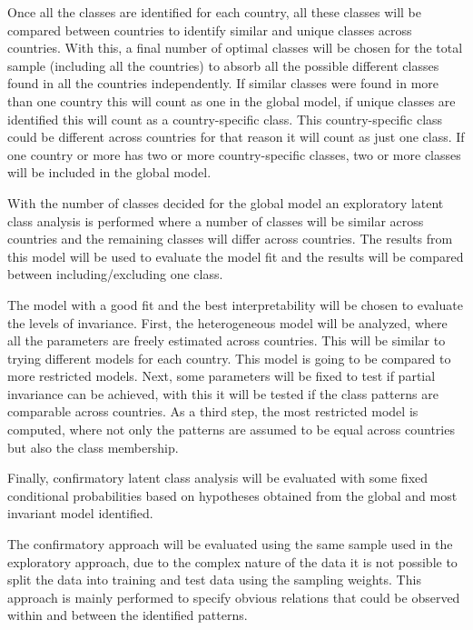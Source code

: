 \documentclass[12pt,a4paper,oneside]{reedthesis}
\begin{document}
Once all the classes are identified for each country, all these classes will be compared between countries to identify similar and unique classes across countries. With this, a final number of optimal classes will be chosen for the total sample (including all the countries) to absorb all the possible different classes found in all the countries independently. If similar classes were found in more than one country this will count as one in the global model, if unique classes are identified this will count as a country-specific class. This country-specific class could be different across countries for that reason it will count as just one class. If one country or more has two or more country-specific classes, two or more classes will be included in the global model.

With the number of classes decided for the global model an exploratory latent class analysis is performed where a number of classes will be similar across countries and the remaining classes will differ across countries. The results from this model will be used to evaluate the model fit and the results will be compared between including/excluding one class.

The model with a good fit and the best interpretability will be chosen to evaluate the levels of invariance. First, the heterogeneous model will be analyzed, where all the parameters are freely estimated across countries. This will be similar to trying different models for each country. This model is going to be compared to more restricted models. Next, some parameters will be fixed to test if partial invariance can be achieved, with this it will be tested if the class patterns are comparable across countries. As a third step, the most restricted model is computed, where not only the patterns are assumed to be equal across countries but also the class membership.

Finally, confirmatory latent class analysis will be evaluated with some fixed conditional probabilities based on hypotheses obtained from the global and most invariant model identified.

The confirmatory approach will be evaluated using the same sample used in the exploratory approach, due to the complex nature of the data it is not possible to split the data into training and test data using the sampling weights. This approach is mainly performed to specify obvious relations that could be observed within and between the identified patterns.
\end{document}
